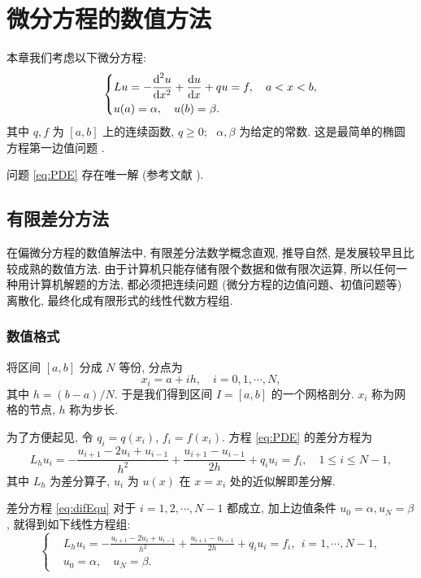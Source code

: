 

\chapter{微分方程的数值方法}

本章我们考虑以下微分方程:
\begin{equation}\label{eq:PDE}
\left\{\begin{aligned}
& L u=-\frac{{\mathop{}\!\mathrm{d}}^{2} u}{\mathop{}\!\mathrm{d} x^{2}}+\frac{\mathop{}\!\mathrm{d} u}{\mathop{}\!\mathrm{d} x}+q u=f, \quad a < x < b, \\
& u(a)=\alpha, \quad u(b)=\beta.
\end{aligned}\right.
\end{equation}
其中 $q, f$ 为 $[a,b]$ 上的连续函数, $q \geqslant 0$;~ $\alpha, \beta$ 为给定的常数. 这是最简单的椭圆方程第一边值问题 .

问题 \eqref{eq:PDE} 存在唯一解 (参考文献 \cite{LiLiu1997}).


\section{有限差分方法}
在偏微分方程的数值解法中, 有限差分法数学概念直观, 推导自然, 是发展较早且比较成熟的数值方法. 由于计算机只能存储有限个数据和做有限次运算, 所以任何一种用计算机解题的方法, 都必须把连续问题 (微分方程的边值问題、初值问题等) 离散化, 最终化成有限形式的线性代数方程组.

\subsection{数值格式}
将区间 $[a,b]$ 分成 $N$ 等份, 分点为
\begin{equation*}
  x_{i} = a+ih, \quad i=0,1, \cdots, N,
\end{equation*}
其中 $h=(b-a)/N$. 于是我们得到区间 $I=[a,b]$ 的一个网格剖分. $x_i$ 称为网格的节点, $h$ 称为步长.

为了方便起见, 令 $q_{i}=q(x_{i})$, $f_{i}=f(x_{i})$. 方程 \eqref{eq:PDE} 的差分方程为
\begin{equation}\label{eq:difEqu}
  L_{h} u_{i}=-\frac{u_{i+1}-2 u_{i}+u_{i-1}}{h^{2}}+\frac{u_{i+1}-u_{i-1}}{2h}+q_{i} u_{i}=f_{i},\quad 1 \leqslant i \leqslant N-1,
\end{equation}
其中 $L_{h}$ 为差分算子, $u_i$ 为 $u(x)$ 在 $x=x_i$ 处的近似解即差分解.

差分方程 \eqref{eq:difEqu} 对于 $i=1,2, \cdots, N-1$ 都成立, 加上边值条件 $u_{0}=\alpha, u_{N}=\beta$, 就得到如下线性方程组:
\begin{equation}\label{eq:fdm}
\left\{\begin{aligned}
& L_{h} u_{i}=-\frac{u_{i+1}-2 u_{i}+u_{i-1}}{h^{2}}+\frac{u_{i+1}-u_{i-1}}{2h}+q_{i} u_{i}=f_{i}, ~~ i=1, \cdots, N-1, \\
& u_{0}=\alpha, \quad u_{N}=\beta.
\end{aligned}\right.
\end{equation}

